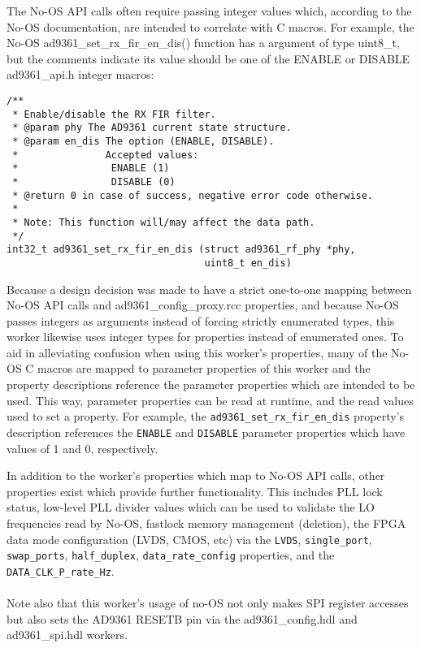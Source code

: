 \documentclass{article}
\def\comp{ad9361\_config\_proxy}
\begin{document}
\noindent
The No-OS API calls often require passing integer values which, according to the No-OS documentation, are intended to correlate with C macros. For example, the No-OS ad9361\_set\_rx\_fir\_en\_dis() function has a argument of type uint8\_t, but the comments indicate its value should be one of the ENABLE or DISABLE ad9361\_api.h integer macros:\pagebreak
\begin{lstlisting}
/**
 * Enable/disable the RX FIR filter.
 * @param phy The AD9361 current state structure.
 * @param en_dis The option (ENABLE, DISABLE).
 *               Accepted values:
 *                ENABLE (1)
 *                DISABLE (0)
 * @return 0 in case of success, negative error code otherwise.
 *
 * Note: This function will/may affect the data path.
 */
int32_t ad9361_set_rx_fir_en_dis (struct ad9361_rf_phy *phy,
                                  uint8_t en_dis)
\end{lstlisting}
\begin{sloppypar}
\noindent
Because a design decision was made to have a strict one-to-one mapping between No-OS API calls and \comp{}.rcc properties, and because No-OS passes integers as arguments instead of forcing strictly enumerated types, this worker likewise uses integer types for properties instead of enumerated ones. To aid in alleviating confusion when using this worker's properties, many of the No-OS C macros are mapped to parameter properties of this worker and the property descriptions reference the parameter properties which are intended to be used. This way, parameter properties can be read at runtime, and the read values used to set a property. For example, the \verb+ad9361_set_rx_fir_en_dis+ property's description references the \verb+ENABLE+ and \verb+DISABLE+ parameter properties which have values of 1 and 0, respectively. \\
\end{sloppypar}
In addition to the worker's properties which map to No-OS API calls, other properties exist which provide further functionality. This includes PLL lock status, low-level PLL divider values which can be used to validate the LO frequencies read by No-OS, fastlock memory management (deletion), the FPGA data mode configuration (LVDS, CMOS, etc) via the \verb+LVDS+, \verb+single_port+, \verb+swap_ports+, \verb+half_duplex+, \verb+data_rate_config+ properties, and the \verb+DATA_CLK_P_rate_Hz+.\\ \\
Note also that this worker's usage of no-OS not only makes SPI register accesses but also sets the AD9361 RESETB pin via the ad9361\_config.hdl\cite{config_comp_datasheet} and ad9361\_spi.hdl\cite{spi_comp_datasheet} workers.
\end{document}
